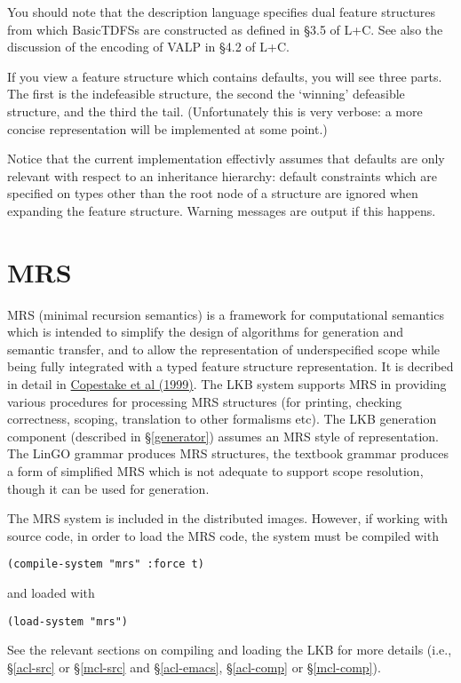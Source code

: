 \documentclass[12pt]{report}
\begin{document}
You should note that the description language specifies
dual feature structures from which
BasicTDFSs are constructed
as defined in \S 3.5 of L+C.  See also the discussion of the encoding
of VALP in \S 4.2 of L+C.

If you view a feature structure which contains defaults,
you will see three parts.  The first is the indefeasible structure,
the second the `winning' defeasible structure, and the third 
the tail.  (Unfortunately this is very verbose: a more concise 
representation will be implemented at some point.)

Notice that the current implementation effectivly assumes that
defaults are only relevant with respect to an inheritance hierarchy:
default constraints which are specified on types other than the root
node of a structure are ignored when expanding the feature structure.
Warning messages are output if this happens.

\section{MRS}
\label{mrs}

MRS (minimal recursion semantics) is a framework for
computational semantics which is intended to
simplify the design of algorithms for generation and semantic transfer, and
to allow the representation of underspecified scope while
being fully integrated with a typed
feature structure representation.
It is decribed in detail in 
\href{http://www-csli.stanford.edu/~aac/papers/mrs.pdf}{Copestake 
et al (1999)}.
The LKB system supports MRS in providing various procedures for
processing MRS structures (for printing, checking correctness,
scoping, translation to other formalisms etc).  
The LKB generation component (described in \S\ref{generator})
assumes an MRS style of representation.  The LinGO grammar
produces MRS structures, the textbook grammar produces a form of
simplified MRS which is not adequate to support scope resolution, though
it can be used for generation.

The MRS system is included in the distributed images.  However,
if working with
source code,
in order to load the MRS code, the system must be
compiled with 
\begin{verbatim}
(compile-system "mrs" :force t)
\end{verbatim}
and loaded with
\begin{verbatim}
(load-system "mrs")
\end{verbatim}
See the relevant sections on compiling and loading the LKB for 
more details
(i.e., \S\ref{acl-src} or \S\ref{mcl-src} and 
\S\ref{acl-emacs}, \S\ref{acl-comp} or \S\ref{mcl-comp}).
\end{document}
